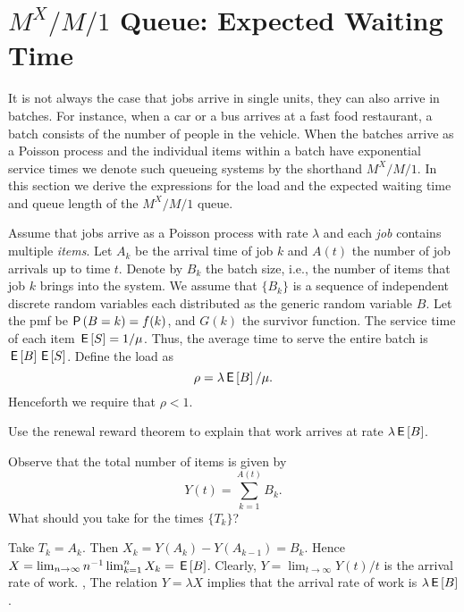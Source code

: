 \section
{$M^X/M/1$ Queue: Expected Waiting Time}
\label{sec:mxm1-queue:-expected}



It is not always the case that jobs arrive in single units, they can also arrive in batches.
For instance, when a car or a bus arrives at a fast food restaurant, a batch consists of the number of people in the vehicle.
When the batches arrive as a Poisson process and the individual items within a batch have exponential service times we denote such queueing systems by the shorthand $M^X/M/1$.
In this section we derive the expressions for the load and the expected waiting time and queue length of the $M^X/M/1$ queue.


Assume that jobs arrive as a Poisson process with rate $\lambda$ and each \emph{job} contains multiple \emph{items}.
Let $A_k$ be the arrival time of job $k$ and $A(t)$ the number of job arrivals up to time $t$.
Denote by $B_k$ the batch size, i.e., the number of items that job $k$ brings into the system.
We assume that $\{B_k\}$ is a sequence of independent discrete random variables each distributed as the generic random variable $B$.
Let the pmf be $\P{B = k} = f(k)$, and $G(k)$ the survivor function.
The service time of each item $\,\mathsf{E}\left[S\right] = 1/\mu$.
Thus, the average time to serve the entire batch is $\,\mathsf{E}\left[B\right] \,\mathsf{E}\left[S\right]$.
 Define the load as
\begin{equation*}
\rho = \lambda \,\mathsf{E}\left[B\right]/\mu.
\end{equation*}
Henceforth we require that $\rho< 1$.


\begin{exercise} 
Use the renewal reward theorem to explain that work arrives at rate $\lambda \,\mathsf{E}\left[B\right]$.
\begin{hint}
Observe that the total number of items is given by
\begin{equation*}
Y(t)=  \sum_{k=1}^{A(t)} B_k.
\end{equation*}
What should you take for the times $\{T_k\}$? 
\end{hint}
\begin{solution}
Take $T_k = A_k$. Then $X_k = Y(A_k) - Y(A_{k-1}) = B_k$.  Hence $X = \lim_{n\to\infty} n^{-1} \lim_{k=1}^n X_k = \,\mathsf{E}\left[B\right]$. Clearly, $Y = \lim_{t\to\infty} Y(t)/t$ is the arrival rate of work. , The relation $Y=\lambda  X$ implies that the arrival rate of work is $\lambda \,\mathsf{E}\left[B\right]$. 
\end{solution}
\end{exercise}



